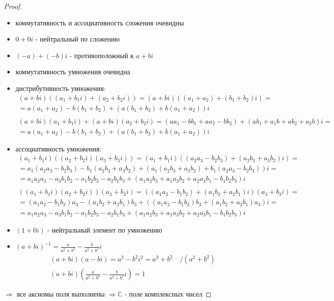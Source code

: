 \begin{proof} \quad \\
    \begin{itemize}
        \item коммутативность и ассоциативность сложения очевидны
        \item $0 + 0i$ - нейтральный по сложению
        \item $(-a) + (-b)i$ - противоположный к $a + bi$
        \item коммутативность умножения очевидна
        \item дистрибутивность умножения:
        \begin{gather*}
            (a + bi)((a_1 + b_1i) + (a_2 + b_2i)) = (a + bi)((a_1 + a_2) + (b_1 + b_2)i) = \\
            = a(a_1 + a_2) - b(b_1 + b_2) + (a(b_1 + b_2) + b(a_1 + a_2))i \\ \\
            (a + bi)(a_1 + b_1i) + (a + bi)(a_2 + b_2i) = (aa_1 - bb_1 + aa_2 - bb_2) + (ab_1 + a_1b + ab_2 + a_2b)i = \\
            = a(a_1 + a_2) - b(b_1 + b_2) + (a(b_1 + b_2) + b(a_1 + a_2))i
        \end{gather*}
        \item ассоциативность умножения:
        \begin{gather*}
            (a_1 + b_1i)((a_2 + b_2i)(a_3 + b_3i)) = (a_1 + b_1i)((a_2a_3 - b_2b_3) + (a_2b_3 + a_3b_2)i) = \\
            = a_1(a_2a_3 - b_2b_3) - b_1(a_2b_3 + a_3b_2) + (a_1(a_2b_3 + a_3b_2) + b_1(a_2a_3 - b_2b_3))i = \\
            = a_1a_2a_3 - a_3b_1b_2 - a_1b_2b_3 - a_2b_1b_3 + (a_1a_2b_3 + a_1a_3b_2 + a_2a_3b_1 - b_1b_2b_3)i  \\ \\
            ((a_1 + b_1i)(a_2 + b_2i))(a_3 + b_3i) = ((a_1a_2 - b_1b_2) + (a_1b_2 + a_2b_1)i)(a_3 + b_3i) = \\
            = (a_1a_2 - b_1b_2)a_3 - (a_1b_2 + a_2b_1)b_3 + ((a_1a_2 - b_1b_2)b_3 + (a_1b_2 + a_2b_1)a_3)i = \\
            = a_1a_2a_3 - a_3b_1b_2 - a_1b_2b_3 - a_2b_1b_3 + (a_1a_2b_3 + a_1a_3b_2 + a_2a_3b_1 - b_1b_2b_3)i
        \end{gather*}
        \item $(1 + 0i)$ - нейтральный элемент по умножению 
        \item $(a + bi)^{-1} = \frac{a}{a^2 + b^2} - \frac{b}{a^2 + b^2}i$
        \begin{gather*}
            (a + bi)(a - bi) = a^2 - b^2i^2 = a^2 + b^2 \quad  /(a^2 + b^2) \\
            (a + bi)(\frac{a}{a^2 + b^2} - \frac{b}{a^2 + b^2}i) = 1
        \end{gather*}
    \end{itemize}
    $\Rightarrow$ все аксиомы поля выполнены $\Rightarrow \mathbb{C}$ - поле комплексных чисел 
\end{proof}
